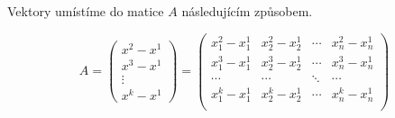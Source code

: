 
Vektory umístíme do matice $A$ následujícím způsobem.

\begingroup
\renewcommand*{\arraystretch}{1.25}
\begin{equation*}
  A =
  \begin{pmatrix}
    x^2-x^1 \\
    x^3-x^1 \\
    \vdots  \\
    x^k-x^1
  \end{pmatrix}
  =
  \begin{pmatrix}
    x^2_1 - x^1_1 & x^2_2 - x^1_2 & \cdots & x^2_n - x^1_n \\
    x^3_1 - x^1_1 & x^3_2 - x^1_2 & \cdots & x^3_n - x^1_n \\
    \cdots        & \cdots        & \ddots & \cdots        \\
    x^k_1 - x^1_1 & x^k_2 - x^1_2 & \cdots & x^k_n - x^1_n \\
  \end{pmatrix}
\end{equation*}
\endgroup


